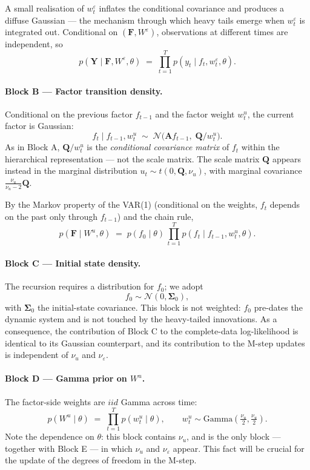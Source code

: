 \documentclass[11pt, a4paper, oneside]{article}
\newcommand{\mY}{\mathbf{Y}}
\newcommand{\mF}{\mathbf{F}}
\newcommand{\mA}{\mathbf{A}}
\newcommand{\mQ}{\mathbf{Q}}
\begin{document}
A small realisation of $w^\varepsilon_t$ inflates the conditional
covariance and produces a diffuse Gaussian — the mechanism through
which heavy tails emerge when $w^\varepsilon_t$ is integrated out.
Conditional on $(\mF, W^\varepsilon)$, observations at different times
are independent, so
\[
p(\mY \mid \mF, W^\varepsilon, \theta) \;=\; \prod_{t=1}^{T} p(y_t \mid f_t, w^\varepsilon_t, \theta).
\]

\paragraph{Block B — Factor transition density.}
Conditional on the previous factor $f_{t-1}$ and the factor weight
$w^u_t$, the current factor is Gaussian:
\[
f_t \mid f_{t-1}, w^u_t \;\sim\; \mathcal{N}\!\big(\mA f_{t-1},\; \mQ / w^u_t\big).
\]
As in Block A, $\mQ / w^u_t$ is the \emph{conditional covariance
matrix} of $f_t$ within the hierarchical representation — not the scale
matrix. The scale matrix $\mQ$ appears instead in the marginal
distribution $u_t \sim t(0, \mQ, \nu_u)$, with marginal covariance
$\tfrac{\nu_u}{\nu_u - 2}\mQ$.

By the Markov property of the VAR(1) (conditional on the weights, $f_t$ depends on
the past only through $f_{t-1}$) and the chain rule,
\[
p(\mF \mid W^u, \theta) \;=\; p(f_0 \mid \theta)\, \prod_{t=1}^{T} p(f_t \mid f_{t-1}, w^u_t, \theta).
\]

\paragraph{Block C — Initial state density.}
The recursion requires a distribution for $f_0$; we adopt
\[
f_0 \sim \mathcal{N}(0, \boldsymbol{\Sigma}_0),
\]
with $\boldsymbol{\Sigma}_0$ the initial-state covariance. This block
is not weighted: $f_0$ pre-dates the dynamic system and is not touched
by the heavy-tailed innovations. As a consequence, the contribution of
Block C to the complete-data log-likelihood is identical to its
Gaussian counterpart, and its contribution to the M-step updates is
independent of $\nu_u$ and $\nu_\varepsilon$. 

\paragraph{Block D — Gamma prior on $W^u$.}
The factor-side weights are $iid$ Gamma across time:
\[
p(W^u \mid \theta) \;=\; \prod_{t=1}^{T} p(w^u_t \mid \theta),
\qquad
w^u_t \sim \mathrm{Gamma}(\tfrac{\nu_u}{2}, \tfrac{\nu_u}{2}).
\]
Note the dependence on $\theta$: this block contains $\nu_u$, and is the
only block — together with Block E — in which $\nu_u$ and
$\nu_\varepsilon$ appear. This fact will be crucial for the update of
the degrees of freedom in the M-step.
\end{document}
